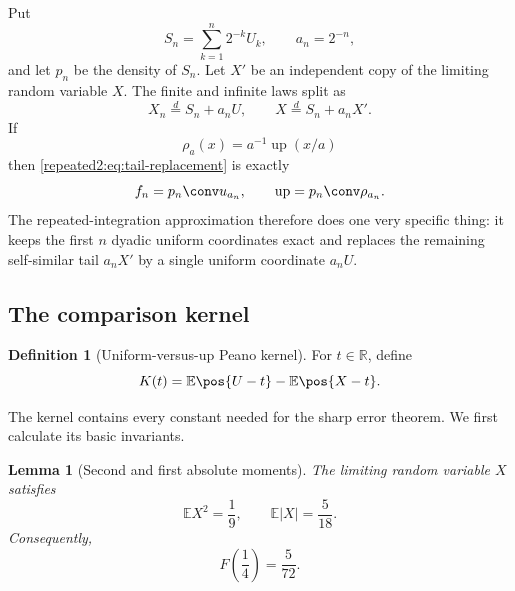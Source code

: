 \documentclass[11pt,oneside]{article}
\newtheorem{lemma}[lemma]{Lemma}
\theoremstyle{definition}
\newtheorem{definition}[definition]{Definition}
\theoremstyle{remark}
\newcommand{\R}{\mathbb R}
\newcommand{\Up}{\operatorname{up}}
\newcommand{\E}{\mathbb E}
\begin{document}
Put
\begin{equation}
 S_n=\sum_{k=1}^{n}2^{-k}U_k,
 \qquad a_n=2^{-n},
 \label{repeated2:eq:Sn-an}
\end{equation}
and let $p_n$ be the density of $S_n$.  Let $X'$ be an independent copy of the limiting
random variable $X$.  The finite and infinite laws split as
\begin{equation}
 X_n\stackrel d=S_n+a_nU,
 \qquad
 X\stackrel d=S_n+a_nX'.
 \label{repeated2:eq:tail-replacement}
\end{equation}
If
\begin{equation}
 \rho_a(x)=a^{-1}\Up(x/a)
 \label{repeated2:eq:scaled-up-density}
\end{equation}
then \eqref{repeated2:eq:tail-replacement} is exactly
\begin{equation}
 f_n=p_n\conv u_{a_n},
 \qquad
 \Up=p_n\conv\rho_{a_n}.
 \label{repeated2:eq:finite-infinite-convolution-split}
\end{equation}
The repeated-integration approximation therefore does one very specific thing: it keeps the
first $n$ dyadic uniform coordinates exact and replaces the remaining self-similar tail
$a_nX'$ by a single uniform coordinate $a_nU$.

\subsection{The comparison kernel}

\begin{definition}[Uniform-versus-up Peano kernel]
\label{repeated2:def:comparison-kernel}
For $t\in\R$, define
\begin{equation}
 K(t)=\E\pos{U-t}-\E\pos{X-t}.
 \label{repeated2:eq:K-definition}
\end{equation}
\end{definition}

The kernel contains every constant needed for the sharp error theorem.  We first calculate
its basic invariants.

\begin{lemma}[Second and first absolute moments]
\label{repeated2:lem:up-moments}
The limiting random variable $X$ satisfies
\begin{equation}
 \E X^2=\frac19,
 \qquad
 \E|X|=\frac5{18}.
 \label{repeated2:eq:X-moments}
\end{equation}
Consequently,
\begin{equation}
 F\left(\frac14\right)=\frac5{72}.
 \label{repeated2:eq:F-quarter}
\end{equation}
\end{lemma}
\end{document}
